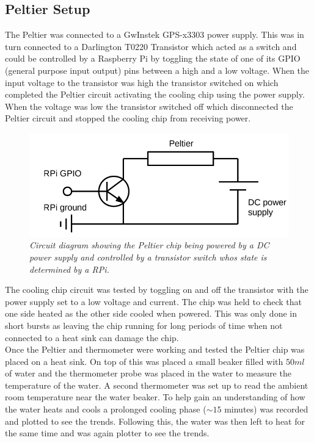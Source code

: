 \documentclass[10pt]{article}
\begin{document}
\subsection*{Peltier Setup}
The Peltier was connected to a GwInstek GPS-x3303 power supply\cite{powe_sup}. This was in turn connected to a Darlington T0220 Transistor\cite{trans} which acted as a switch and could be controlled by a Raspberry Pi by toggling the state of one of its GPIO (general purpose input output) pins between a high and a low voltage. When the input voltage to the transistor was high the transistor switched on which completed the Peltier circuit activating the cooling chip using the power supply. When the voltage was low the transistor switched off which disconnected the Peltier circuit and stopped the cooling chip from receiving power.\\

\begin{figure}[h!]
    \centering
    \includegraphics[scale=0.5]{circuit.png}
    \caption{\it{Circuit diagram showing the Peltier chip being powered by a DC power supply and controlled by a transistor switch whos state is determined by a RPi\cite{course_notes}.}}
    \label{fig:circuit}
\end{figure}

The cooling chip circuit was tested by toggling on and off the transistor with the power supply set to a low voltage and current. The chip was held to check that one side heated as the other side cooled when powered. This was only done in short bursts as leaving the chip running for long periods of time when not connected to a heat sink can damage the chip. \\

Once the Peltier and thermometer were working and tested the Peltier chip was placed on a heat sink. On top of this was placed a small beaker filled with $50ml$ of water and the thermometer probe was placed in the water to measure the temperature of the water. A second thermometer was set up to read the ambient room temperature near the water beaker. To help gain an understanding of how the water heats and cools a prolonged cooling phase ($\sim15$ minutes) was recorded and plotted to see the trends. Following this, the water was then left to heat for the same time and was again plotter to see the trends.
\end{document}
